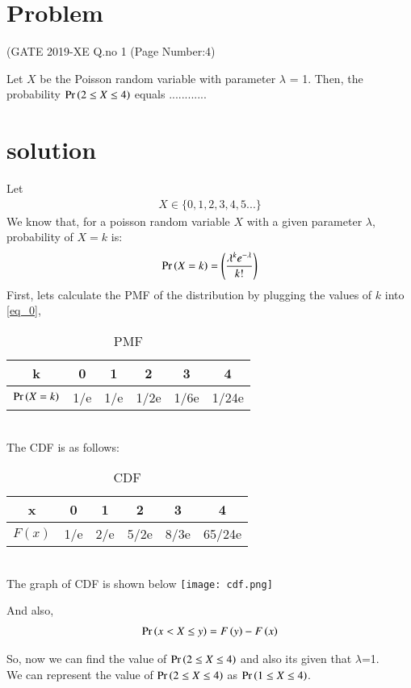 \documentclass[journal,12pt,twocolumn]{IEEEtran}
\begin{document}
\section{Problem}
\begin{center}
	(GATE 2019-XE Q.no 1 (Page Number:4)
\end{center}
Let $X$ be the Poisson random variable with parameter $\lambda$ = 1. Then, the probability 
$\Pr\left(2 \leq X \leq 4\right)$ equals ............
\section{solution}
Let 
\begin{align}
	X\in \{0,1,2,3,4,5...\}
\end{align}
We know that, for a poisson random variable $X$ with a given parameter $\lambda$, probability of $X=k$ is:
\begin{align} \label{eq_0}
	\Pr\left(X=k\right)=\left(\frac{\lambda^k e^{-\lambda}}{k!}\right)	
\end{align}
First, lets calculate the PMF of the distribution by plugging the values of $k$ into \ref{eq_0},
\begin{table}[ht]
  \centering
  \begin{tabular}{|c|c|c|c|c|c|}
    \hline
    k &  0 & 1 & 2 & 3 & 4\\
    \hline
    $\Pr\left(X=k\right)$ & 1/e & 1/e & 1/2e & 1/6e & 1/24e\\
    \hline
\end{tabular}
\caption{ PMF}
\label{Table_0}
\end{table}\\
The CDF is as follows:
\begin{table}[ht]
  \centering
  \begin{tabular}{|c|c|c|c|c|c|}
    \hline
    x &  0 & 1 & 2 & 3 & 4\\
    \hline
    $F(x)$ & 1/e & 2/e & 5/2e & 8/3e & 65/24e\\
    \hline
\end{tabular} 
\caption{CDF}
\label{Table_1}
\end{table}\\
The graph of CDF is shown below
\texttt{[image: cdf.png]}

And also,
\begin{align}
    \Pr\left(x < X \le y\right) = F\left(y\right) - F\left(x\right)\label{eq_1}
\end{align}

So, now we can find the value of $\Pr\left(2 \leq X \leq 4\right)$ and also its given that $\lambda$=1.\\
We can represent the value of $\Pr\left(2 \leq X \leq 4\right)$ as $\Pr\left(1 \le X \leq 4\right)$.\\
\end{document}
